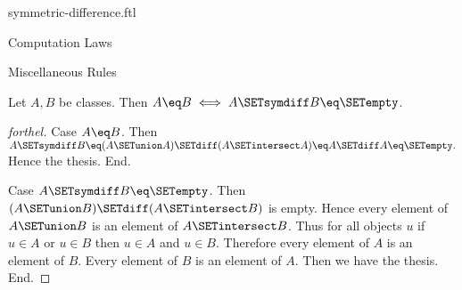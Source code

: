 \documentclass{naproche-library}
\begin{document}
\begin{smodule}[title=Symmetric Difference]{symmetric-difference.ftl}
\begin{sfragment}{Computation Laws}
\begin{sfragment}{Miscellaneous Rules}
    \begin{proposition}[forthel,id=FOUNDATIONS_03_6111806917443584]
      Let $A, B$ be classes.
      Then $A \eq B \iff A \SETsymdiff B \eq \SETempty$.
    \end{proposition}
    \begin{proof}[forthel]
      Case $A \eq B$.
        Then $A \SETsymdiff B
          \eq (A \SETunion A) \SETdiff (A \SETintersect A)
          \eq A \SETdiff A
          \eq \SETempty.$
        Hence the thesis.
      End.

      Case $A \SETsymdiff B \eq \SETempty$.
        Then $(A \SETunion B) \SETdiff (A \SETintersect B)$ is empty.
        Hence every element of $A \SETunion B$ is an element of $A \SETintersect B$.
        Thus for all objects $u$ if $u \in A$ or $u \in B$ then $u \in A$ and $u \in B$.
        Therefore every element of $A$ is an element of $B$.
        Every element of $B$ is an element of $A$.
        Then we have the thesis.
      End.
    \end{proof}
  \end{sfragment}
\end{sfragment}
\end{smodule}
\end{document}
